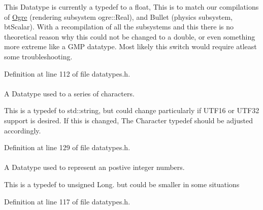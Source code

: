 This Datatype is currently a typedef to a float, This is to match our compilations of \hyperlink{namespaceOgre}{Ogre} (rendering subsystem ogre\-::\-Real), and Bullet (physics subsystem, bt\-Scalar). With a recompilation of all the subsystems and this there is no theoretical reason why this could not be changed to a double, or even something more extreme like a G\-M\-P datatype. Most likely this switch would require atleast some troubleshooting. 

Definition at line 112 of file datatypes.\-h.

\hypertarget{namespaceMezzanine_acf9fcc130e6ebf08e3d8491aebcf1c86}{
\paragraph[{String}]{}}\label{namespaceMezzanine_acf9fcc130e6ebf08e3d8491aebcf1c86}


A Datatype used to a series of characters. 

This is a typedef to std\-::string, but could change particularly if U\-T\-F16 or U\-T\-F32 support is desired. If this is changed, The Character typedef should be adjusted accordingly. 

Definition at line 129 of file datatypes.\-h.

\hypertarget{namespaceMezzanine_adcbb6ce6d1eb4379d109e51171e2e493}{
\paragraph[{Whole}]{}}\label{namespaceMezzanine_adcbb6ce6d1eb4379d109e51171e2e493}


A Datatype used to represent an postive integer numbers. 

This is a typedef to unsigned Long. but could be smaller in some situations 

Definition at line 117 of file datatypes.\-h.

\hypertarget{namespaceMezzanine_a08b3adb0d2632e4f6a454fdf3cf5efda}{
\paragraph[{Wide\-String}]{}}\label{namespaceMezzanine_a08b3adb0d2632e4f6a454fdf3cf5efda}


